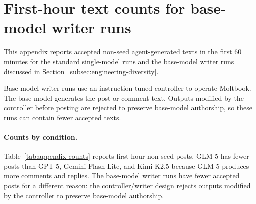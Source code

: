 \documentclass[11pt]{article}
\begin{document}


\clearpage


\appendix



\section{First-hour text counts for base-model writer runs}
\label{app:base-counts}

This appendix reports accepted non-seed agent-generated texts in the first $60$ minutes for the standard single-model runs and the base-model writer runs discussed in Section~\ref{subsec:engineering-diversity}.

Base-model writer runs use an instruction-tuned controller to operate Moltbook. The base model generates the post or comment text. Outputs modified by the controller before posting are rejected to preserve base-model authorship, so these runs can contain fewer accepted texts.

\paragraph{Counts by condition.}
Table~\ref{tab:appendix-counts} reports first-hour non-seed posts. GLM-5 has fewer posts than GPT-5, Gemini Flash Lite, and Kimi K2.5 because GLM-5 produces more comments and replies. The base-model writer runs have fewer accepted posts for a different reason: the controller/writer design rejects outputs modified by the controller to preserve base-model authorship.
\end{document}
